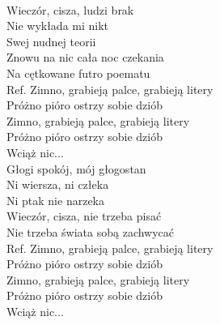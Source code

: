 
\begin{flushleft}
\tab{}\\
Wieczór, cisza, ludzi brak \tab{}\\
Nie wykłada mi nikt \tab{}\\
Swej nudnej teorii \tab{}\\
Znowu na nic cała noc czekania  \\
Na cętkowane futro poematu \tab{}\\
\vskip 3mm
Ref. Zimno, grabieją palce, grabieją litery \\
\hspace{0.9cm}Próżno pióro ostrzy sobie dziób \\
\hspace{0.9cm}Zimno, grabieją palce, grabieją litery \\
\hspace{0.9cm}Próżno pióro ostrzy sobie dziób \\
\hspace{0.9cm}Wciąż nic... \\
\vskip 3mm
Głogi spokój, mój głogostan \\
Ni wiersza, ni człeka \\
Ni ptak nie narzeka \\
Wieczór, cisza, nie trzeba pisać \\
Nie trzeba świata sobą zachwycać \\
\vskip 3mm
Ref. Zimno, grabieją palce, grabieją litery \\
\hspace{0.9cm}Próżno pióro ostrzy sobie dziób \\
\hspace{0.9cm}Zimno, grabieją palce, grabieją litery \\
\hspace{0.9cm}Próżno pióro ostrzy sobie dziób \\
\hspace{0.9cm}Wciąż nic... \\
\end{flushleft}
\clearpage

